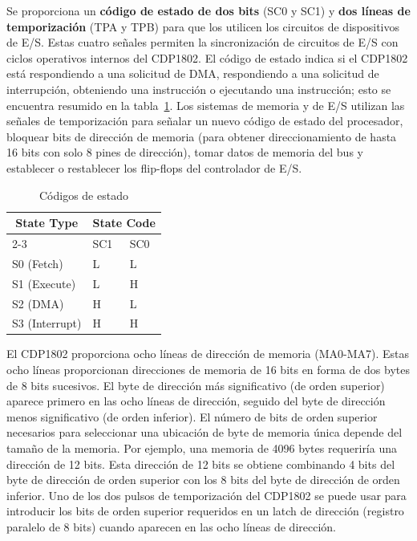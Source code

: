 Se proporciona un \textbf{código de estado de dos bits} (SC0 y SC1) y \textbf{dos líneas de temporización} (TPA y TPB) para que los utilicen los circuitos de dispositivos de E/S. Estas cuatro señales permiten la sincronización de circuitos de E/S con ciclos operativos internos del CDP1802. El código de estado indica si el CDP1802 está respondiendo a una solicitud de DMA, respondiendo a una solicitud de interrupción, obteniendo una instrucción o ejecutando una instrucción; esto se encuentra resumido en la tabla~\ref{T:state_codes}. Los sistemas de memoria y de E/S utilizan las señales de temporización para señalar un nuevo código de estado del procesador, bloquear bits de dirección de memoria (para obtener direccionamiento de hasta 16 bits con solo 8 pines de dirección), tomar datos de memoria del bus y establecer o restablecer los flip-flops del controlador de E/S.

\begin{table}[ht!]
\caption{Códigos de estado}
\label{T:state_codes}
\begin{tabular}{|l|ll|}
\hline
\multicolumn{1}{|c|}{\multirow{2}{*}{State Type}} & \multicolumn{2}{l|}{State Code} \\ \cline{2-3} 
\multicolumn{1}{|c|}{}                            & \multicolumn{1}{l|}{SC1}  & SC0 \\ \hline
S0 (Fetch)                                        & \multicolumn{1}{l|}{L}    & L   \\ \hline
S1 (Execute)                                      & \multicolumn{1}{l|}{L}    & H   \\ \hline
S2 (DMA)                                          & \multicolumn{1}{l|}{H}    & L   \\ \hline
S3 (Interrupt)                                    & \multicolumn{1}{l|}{H}    & H   \\ \hline
\end{tabular}
\end{table}

El CDP1802 proporciona ocho líneas de dirección de memoria (MA0-MA7). Estas ocho líneas proporcionan direcciones de memoria de 16 bits en forma de dos bytes de 8 bits sucesivos. El byte de dirección más significativo (de orden superior) aparece primero en las ocho líneas de dirección, seguido del byte de dirección menos significativo (de orden inferior). El número de bits de orden superior necesarios para seleccionar una ubicación de byte de memoria única depende del tamaño de la memoria. Por ejemplo, una memoria de 4096 bytes requeriría una dirección de 12 bits. Esta dirección de 12 bits se obtiene combinando 4 bits del byte de dirección de orden superior con los 8 bits del byte de dirección de orden inferior. Uno de los dos pulsos de temporización del CDP1802 se puede usar para introducir los bits de orden superior requeridos en un latch de dirección (registro paralelo de 8 bits) cuando aparecen en las ocho líneas de dirección.

